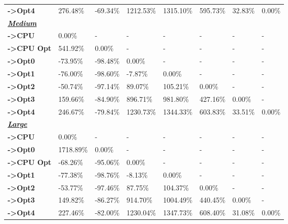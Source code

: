 \begin{table}[H]
\begin{tabular}{llllllll}
    \rowcolor[HTML]{EFEFEF} \cellcolor[HTML]{DAE8FC} \textbf{->Opt4} & 276.48\% & -69.34\% & 1212.53\% & 1315.10\% & 595.73\% & 	32.83\% & 	0.00\% \\
    \cellcolor[HTML]{DAE8FC} \textbf{\textbf{{\emph{{\underline{{Medium}}}}}}} &  &  &  &  &  &  &  \\
    \rowcolor[HTML]{EFEFEF} \cellcolor[HTML]{DAE8FC} \textbf{->CPU} & 0.00\% & - & - & - & - & - & - \\
    \cellcolor[HTML]{DAE8FC} \textbf{->CPU Opt} & 541.92\% & 0.00\% & - & - & - & - & - \\
    \rowcolor[HTML]{EFEFEF} \cellcolor[HTML]{DAE8FC} \textbf{->Opt0} & -73.95\% & -98.48\% & 0.00\% & - & - & - & - \\
    \cellcolor[HTML]{DAE8FC} \textbf{->Opt1} & -76.00\% & -98.60\% & -7.87\% & 0.00\% & - & - & - \\
    \rowcolor[HTML]{EFEFEF} \cellcolor[HTML]{DAE8FC} \textbf{->Opt2} & -50.74\% & -97.14\% & 89.07\% & 105.21\% & 0.00\% & - & - \\
    \cellcolor[HTML]{DAE8FC} \textbf{->Opt3} & 159.66\% & -84.90\% & 896.71\% & 981.80\% & 427.16\% & 	0.00\% & - \\
    \rowcolor[HTML]{EFEFEF} \cellcolor[HTML]{DAE8FC} \textbf{->Opt4} & 246.67\% & -79.84\% & 1230.73\% & 1344.33\% & 603.83\% & 	33.51\% & 	0.00\% \\
    \cellcolor[HTML]{DAE8FC} \textbf{\textbf{{\emph{{\underline{{Large}}}}}}} &  &  &  &  &  &  &  \\
    \rowcolor[HTML]{EFEFEF} \cellcolor[HTML]{DAE8FC} \textbf{->CPU} & 0.00\% & - & - & - & - & - & - \\
    \cellcolor[HTML]{DAE8FC} \textbf{->Opt0} & 1718.89\% & 0.00\% & - & - & - & - & - \\
    \rowcolor[HTML]{EFEFEF} \cellcolor[HTML]{DAE8FC} \textbf{->CPU Opt} & -68.26\% & -95.06\% & 0.00\% & - & - & - & - \\
    \cellcolor[HTML]{DAE8FC} \textbf{->Opt1} & -77.38\% & -98.76\% & -8.13\% & 0.00\% & - & - & - \\
    \rowcolor[HTML]{EFEFEF} \cellcolor[HTML]{DAE8FC} \textbf{->Opt2} & -53.77\% & -97.46\% & 87.75\% & 104.37\% & 0.00\% & - & - \\
    \cellcolor[HTML]{DAE8FC} \textbf{->Opt3} & 149.82\% & -86.27\% & 914.70\% & 1004.49\% & 440.45\% & 	0.00\% & - \\
    \rowcolor[HTML]{EFEFEF} \cellcolor[HTML]{DAE8FC} \textbf{->Opt4} & 227.46\% & -82.00\% & 1230.04\% & 1347.73\% & 608.40\% & 	31.08\% & 	0.00\% \\

\end{tabular}
\end{table}
